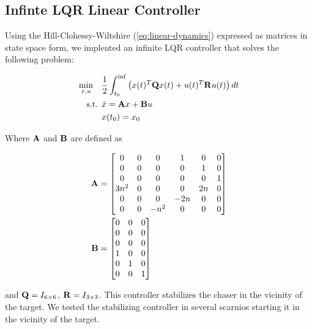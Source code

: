 \documentclass[conference]{IEEEtran}
\begin{document}

\subsection{Infinte LQR Linear Controller}

Using the Hill-Clohessy-Wiltshire (\ref{eq:linear-dynamics})
expressed as matrices in state space form, we
implented an infinite LQR controller that solves the following problem:

\begin{equation}
    \label{eq:linear-infinite-lqr}
    \begin{split}
        \min_{x, u} \ \ \  & \frac{1}{2} \int_{t_0}^{\inf} \left( x(t)^T {\bf Q}
            x(t) + u(t)^T {\bf R} u(t) \right)dt \\
        \text{s.t.   } & \dot{x} = {\bf{A}}x + {\bf B}u \\
                     & x(t_0) = x_0
    \end{split}
\end{equation}

Where ${\bf A}$ and ${\bf B}$ are defined as


\begin{equation}
    \label{eq:linearized-state-space}
    \begin{aligned}
        {\bf A} & = \mat{
            0 & 0 & 0 & 1 & 0 & 0 \\
            0 & 0 & 0 & 0 & 1 & 0 \\
            0 & 0 & 0 & 0 & 0 & 1 \\
            3n^2 & 0 & 0 & 0 & 2n & 0 \\
            0 & 0 & 0 & -2n & 0 & 0 \\
            0 & 0 & -n^2 & 0 & 0 & 0 \\
        } \\
        {\bf B} & = \mat{
            0 & 0 & 0 \\
            0 & 0 & 0 \\
            0 & 0 & 0 \\
            1 & 0 & 0 \\
            0 & 1 & 0 \\
            0 & 0 & 1 \\
        }
    \end{aligned}
\end{equation}

and ${\bf Q} = I_{6\times 6}$, ${\bf R} = I_{3\times 3}$. This controller 
stabilizes the chaser in the vicinity of the target. We tested the stabilizing
controller in several scarnios starting it in the vicinity of the target.
\end{document}
